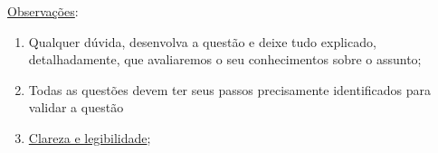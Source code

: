 \documentclass[a4paper,11pt]{article}
\begin{document}
\begin{comment}
\underline{{\large Regras Inferencias Válidas (Teoremas)}}:
{\footnotesize
\begin{description}
\setlength{\itemsep}{-2pt}
\item[Adição (AD):] $P \vdash P \vee Q$ ou $P \vdash Q \vee P$
\item[Simplificação (SIMP):] $P \wedge Q \vdash P$ ou $P \wedge Q \vdash Q$
\item[Conjunção (CONJ)] $P, Q \vdash P \wedge Q$ ou $P, Q \vdash Q \wedge P$
\item[Absorção (ABS):] $P \rightarrow Q \vdash P \rightarrow (P \wedge Q)$
\item[Modus Ponens (MP):] $P \rightarrow Q, P \vdash Q$
\item[Modus Tollens (MT):] $P \rightarrow Q, \sim Q \vdash \sim P$
\item[Silogismo Disjuntivo (SD):] $P \vee Q, \sim P \vdash Q$ ou $P \vee Q, \sim Q \vdash P$
\item[Silogismo Hipotético (SH):] $P \rightarrow Q, Q\rightarrow R \vdash P\rightarrow R$
\item[Dilema Construtivo (DC):] $P\rightarrow Q, R\rightarrow S, P \vee R \vdash Q\vee S$
\item[Dilema Destrutivo (DD):] $P\rightarrow Q, R\rightarrow S, \sim Q\vee\sim S \vdash \sim P \vee\sim R$
\end{description}
\end{comment}

\begin{flushleft}
\underline{Observações}:
\begin{enumerate}
\setlength{\itemsep}{-2pt}
\item Qualquer dúvida, desenvolva a questão e deixe tudo explicado, detalhadamente, que avaliaremos o seu conhecimentos sobre  o assunto;

 
 \item Todas as questões devem ter seus passos precisamente identificados para validar a questão
 
  \item \underline{Clareza e legibilidade};
\end{enumerate}
\end{flushleft}
\end{document}
